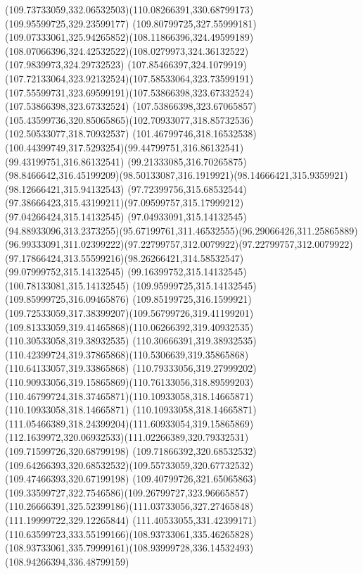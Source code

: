 {{		\curveto(109.73733059,332.06532503)(110.08266391,330.68799173)(109.95599725,329.23599177)
		\curveto(109.80799725,327.55999181)(109.07333061,325.94265852)(108.11866396,324.49599189)
		\curveto(108.07066396,324.42532522)(108.0279973,324.36132522)(107.9839973,324.29732523)
		\curveto(107.85466397,324.1079919)(107.72133064,323.92132524)(107.58533064,323.73599191)
		\curveto(107.55599731,323.69599191)(107.53866398,323.67332524)(107.53866398,323.67332524)
		\lineto(107.53866398,323.67065857)
		\curveto(105.43599736,320.85065865)(102.70933077,318.85732536)(102.50533077,318.70932537)
		\curveto(101.46799746,318.16532538)(100.44399749,317.5293254)(99.44799751,316.86132541)
		\lineto(99.43199751,316.86132541)
		\lineto(99.21333085,316.70265875)
		\curveto(98.8466642,316.45199209)(98.50133087,316.1919921)(98.14666421,315.9359921)
		\lineto(98.12666421,315.94132543)
		\curveto(97.72399756,315.68532544)(97.38666423,315.43199211)(97.09599757,315.17999212)
		\lineto(97.04266424,315.14132545)
		\lineto(97.04933091,315.14132545)
		\curveto(94.88933096,313.2373255)(95.67199761,311.46532555)(96.29066426,311.25865889)
		\curveto(96.99333091,311.02399222)(97.22799757,312.0079922)(97.22799757,312.0079922)
		\curveto(97.17866424,313.55599216)(98.26266421,314.58532547)(99.07999752,315.14132545)
		\lineto(99.16399752,315.14132545)
		\lineto(100.78133081,315.14132545)
		\lineto(109.95999725,315.14132545)
		\lineto(109.85999725,316.09465876)
		\curveto(109.85199725,316.1599921)(109.72533059,317.38399207)(109.56799726,319.41199201)
		\curveto(109.81333059,319.41465868)(110.06266392,319.40932535)(110.30533058,319.38932535)
		\lineto(110.30666391,319.38932535)
		\curveto(110.42399724,319.37865868)(110.5306639,319.35865868)(110.64133057,319.33865868)
		\curveto(110.79333056,319.27999202)(110.90933056,319.15865869)(110.76133056,318.89599203)
		\curveto(110.46799724,318.37465871)(110.10933058,318.14665871)(110.10933058,318.14665871)
		\curveto(110.10933058,318.14665871)(111.05466389,318.24399204)(111.60933054,319.15865869)
		\curveto(112.1639972,320.06932533)(111.02266389,320.79332531)(109.71599726,320.68799198)
		\lineto(109.71866392,320.68532532)
		\curveto(109.64266393,320.68532532)(109.55733059,320.67732532)(109.47466393,320.67199198)
		\curveto(109.40799726,321.65065863)(109.33599727,322.7546586)(109.26799727,323.96665857)
		\curveto(110.26666391,325.52399186)(111.03733056,327.27465848)(111.19999722,329.12265844)
		\curveto(111.40533055,331.42399171)(110.63599723,333.55199166)(108.93733061,335.46265828)
		\curveto(108.93733061,335.79999161)(108.93999728,336.14532493)(108.94266394,336.48799159)
}}
